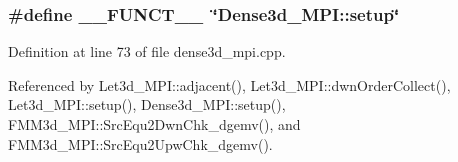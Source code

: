 \subsubsection{\setlength{\rightskip}{0pt plus 5cm}\#define \_\-\_\-FUNCT\_\-\_\-~\char`\"{}Dense3d\_\-MPI::setup\char`\"{}}\label{dense3d__mpi_8cpp_2818853adf63a17949cf67d73c1d4473_2818853adf63a17949cf67d73c1d4473}




Definition at line 73 of file dense3d\_\-mpi.cpp.

Referenced by Let3d\_\-MPI::adjacent(), Let3d\_\-MPI::dwn\-Order\-Collect(), Let3d\_\-MPI::setup(), Dense3d\_\-MPI::setup(), FMM3d\_\-MPI::Src\-Equ2Dwn\-Chk\_\-dgemv(), and FMM3d\_\-MPI::Src\-Equ2Upw\-Chk\_\-dgemv().